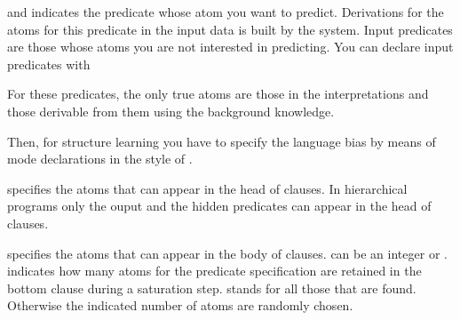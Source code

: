 \documentclass[letterpaper,10pt,english]{sphinxmanual}
\begin{document}
and indicates the predicate whose atom you want to predict.
Derivations for the atoms for this predicate in the input data is built by the system.
Input predicates are those whose atoms you are not interested in predicting.
You can declare input predicates with

\begin{sphinxVerbatim}[commandchars=\\\{\}]
\end{sphinxVerbatim}

For these predicates, the only true atoms are those in the interpretations and those derivable from them using the background knowledge.

Then, for structure learning you have to specify the language bias by means of mode declarations in the style of .

\begin{sphinxVerbatim}[commandchars=\\\{\}]
\end{sphinxVerbatim}

specifies the atoms that can appear in the head of clauses. In hierarchical programs only the ouput and the hidden predicates can appear in the head of clauses.

\begin{sphinxVerbatim}[commandchars=\\\{\}]
\end{sphinxVerbatim}

specifies the atoms that can appear in the body of clauses.  can be an integer or \sphinxcode{\sphinxupquote{*}}.  indicates how many atoms for the predicate specification are retained in the bottom clause during a saturation step. \sphinxcode{\sphinxupquote{*}} stands for all those that are found.
Otherwise the indicated number of atoms are randomly chosen.
\end{document}
